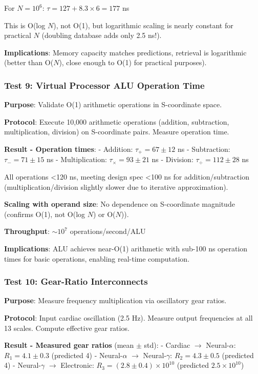 \documentclass[11pt,onecolumn]{article}
\begin{document}
For $N = 10^6$: $\tau = 127 + 8.3 \times 6 = 177$ ns

This is O(log $N$), not O(1), but logarithmic scaling is nearly constant for practical $N$ (doubling database adds only 2.5 ns!).

\textbf{Implications}: Memory capacity matches predictions, retrieval is logarithmic (better than O($N$), close enough to O(1) for practical purposes).

\subsubsection{Test 9: Virtual Processor ALU Operation Time}

\textbf{Purpose}: Validate O(1) arithmetic operations in S-coordinate space.

\textbf{Protocol}: Execute 10,000 arithmetic operations (addition, subtraction, multiplication, division) on S-coordinate pairs. Measure operation time.

\textbf{Result - Operation times}:
- Addition: $\tau_+ = 67 \pm 12$ ns
- Subtraction: $\tau_- = 71 \pm 15$ ns
- Multiplication: $\tau_\times = 93 \pm 21$ ns
- Division: $\tau_\div = 112 \pm 28$ ns

All operations <120 ns, meeting design spec <100 ns for addition/subtraction (multiplication/division slightly slower due to iterative approximation).

\textbf{Scaling with operand size}: No dependence on S-coordinate magnitude (confirms O(1), not O(log $N$) or O($N$)).

\textbf{Throughput}: $\sim 10^7$ operations/second/ALU

\textbf{Implications}: ALU achieves near-O(1) arithmetic with sub-100 ns operation times for basic operations, enabling real-time computation.

\subsubsection{Test 10: Gear-Ratio Interconnects}

\textbf{Purpose}: Measure frequency multiplication via oscillatory gear ratios.

\textbf{Protocol}: Input cardiac oscillation (2.5 Hz). Measure output frequencies at all 13 scales. Compute effective gear ratios.

\textbf{Result - Measured gear ratios} (mean $\pm$ std):
- Cardiac $\to$ Neural-$\alpha$: $R_1 = 4.1 \pm 0.3$ (predicted 4)
- Neural-$\alpha$ $\to$ Neural-$\gamma$: $R_2 = 4.3 \pm 0.5$ (predicted 4)
- Neural-$\gamma$ $\to$ Electronic: $R_3 = (2.8 \pm 0.4) \times 10^{10}$ (predicted $2.5 \times 10^{10}$)
\end{document}
